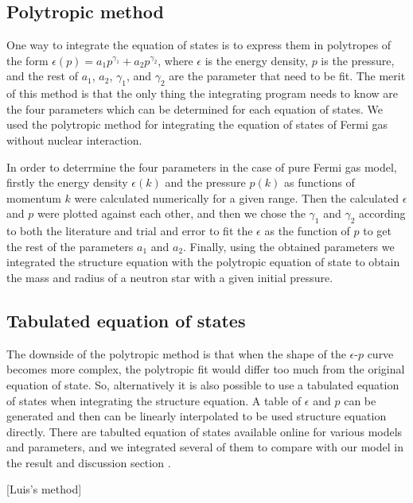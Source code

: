 \documentclass[11pt]{article}
\begin{document}
\subsection{Polytropic method}
One way to integrate the equation of states is to express them in polytropes of the form $\epsilon(p) = a_1 p^{\gamma_1} + a_2 p^{\gamma_2}$, where $\epsilon$ is the energy density, $p$ is the pressure, and the rest of $a_1$, $a_2$, $\gamma_1$, and $\gamma_2$ are the parameter that need to be fit. The merit of this method is that the only thing the integrating program needs to know are the four parameters which can be determined for each equation of states. We used the polytropic method for integrating the equation of states of Fermi gas without nuclear interaction.


In order to deterrmine the four parameters in the case of pure Fermi gas model, firstly the energy density $\epsilon(k)$ and the pressure $p(k)$ as functions of momentum $k$ were calculated numerically for a given range. Then the calculated $\epsilon$ and $p$ were plotted against each other, and then we chose the $\gamma_1$ and $\gamma_2$ according to both the literature and trial and error to fit the $\epsilon$ as the function of $p$ to get the rest of the parameters $a_1$ and $a_2$. Finally, using the obtained parameters we integrated the structure equation with the polytropic equation of state to obtain the mass and radius of a neutron star with a given initial pressure.

        \subsection{Tabulated equation of states}
            The downside of the polytropic method is that when the shape of the $\epsilon$-$p$ curve becomes more complex, the polytropic fit would differ too much from the original equation of state. So, alternatively it is also possible to use a tabulated equation of states when integrating the structure equation. A table of $\epsilon$ and $p$ can be generated and then can be linearly interpolated to be used structure equation directly. There are tabulted equation of states available online for various models and parameters, and we integrated several of them to compare with our model in the result and discussion section \cite{arizona/eos.table}.

[Luis's method]





\end{document}
